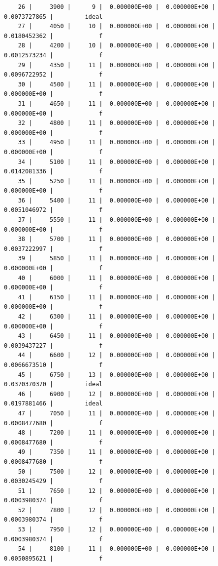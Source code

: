 \documentclass[
  authoryear,
  preprint,
  3p]{elsarticle}
\begin{document}
\begin{verbatim}
    26 |     3900 |      9 |  0.000000E+00 |  0.000000E+00 |  0.0073727865 |         ideal
    27 |     4050 |     10 |  0.000000E+00 |  0.000000E+00 |  0.0180452362 |             f
    28 |     4200 |     10 |  0.000000E+00 |  0.000000E+00 |  0.0012573234 |             f
    29 |     4350 |     11 |  0.000000E+00 |  0.000000E+00 |  0.0096722952 |             f
    30 |     4500 |     11 |  0.000000E+00 |  0.000000E+00 |  0.000000E+00 |             f
    31 |     4650 |     11 |  0.000000E+00 |  0.000000E+00 |  0.000000E+00 |             f
    32 |     4800 |     11 |  0.000000E+00 |  0.000000E+00 |  0.000000E+00 |             f
    33 |     4950 |     11 |  0.000000E+00 |  0.000000E+00 |  0.000000E+00 |             f
    34 |     5100 |     11 |  0.000000E+00 |  0.000000E+00 |  0.0142081336 |             f
    35 |     5250 |     11 |  0.000000E+00 |  0.000000E+00 |  0.000000E+00 |             f
    36 |     5400 |     11 |  0.000000E+00 |  0.000000E+00 |  0.0051046972 |             f
    37 |     5550 |     11 |  0.000000E+00 |  0.000000E+00 |  0.000000E+00 |             f
    38 |     5700 |     11 |  0.000000E+00 |  0.000000E+00 |  0.0037222997 |             f
    39 |     5850 |     11 |  0.000000E+00 |  0.000000E+00 |  0.000000E+00 |             f
    40 |     6000 |     11 |  0.000000E+00 |  0.000000E+00 |  0.000000E+00 |             f
    41 |     6150 |     11 |  0.000000E+00 |  0.000000E+00 |  0.000000E+00 |             f
    42 |     6300 |     11 |  0.000000E+00 |  0.000000E+00 |  0.000000E+00 |             f
    43 |     6450 |     11 |  0.000000E+00 |  0.000000E+00 |  0.0039437227 |             f
    44 |     6600 |     12 |  0.000000E+00 |  0.000000E+00 |  0.0066673510 |             f
    45 |     6750 |     13 |  0.000000E+00 |  0.000000E+00 |  0.0370370370 |         ideal
    46 |     6900 |     12 |  0.000000E+00 |  0.000000E+00 |  0.0197881466 |         ideal
    47 |     7050 |     11 |  0.000000E+00 |  0.000000E+00 |  0.0008477680 |             f
    48 |     7200 |     11 |  0.000000E+00 |  0.000000E+00 |  0.0008477680 |             f
    49 |     7350 |     11 |  0.000000E+00 |  0.000000E+00 |  0.0008477680 |             f
    50 |     7500 |     12 |  0.000000E+00 |  0.000000E+00 |  0.0030245429 |             f
    51 |     7650 |     12 |  0.000000E+00 |  0.000000E+00 |  0.0003980374 |             f
    52 |     7800 |     12 |  0.000000E+00 |  0.000000E+00 |  0.0003980374 |             f
    53 |     7950 |     12 |  0.000000E+00 |  0.000000E+00 |  0.0003980374 |             f
    54 |     8100 |     11 |  0.000000E+00 |  0.000000E+00 |  0.0050895621 |             f

\end{verbatim}
\end{document}
